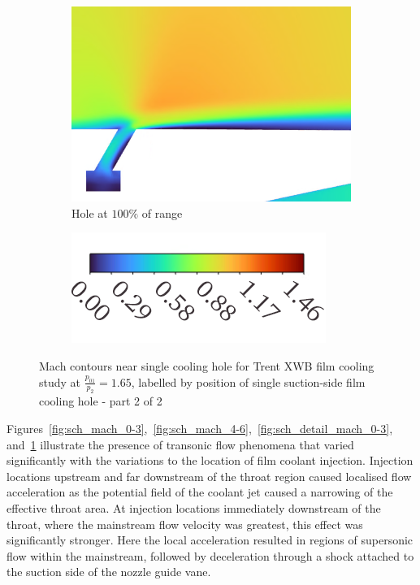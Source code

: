 \documentclass[a4paper, 11pt, oneside]{report}
\begin{document}
\begin{figure}[H]
\begin{subfigure}{.42\textwidth}
		\includegraphics[width=\linewidth]{figs/sch_detail_mach_contours_6.png}
		\caption{Hole at $100\%$ of range}
	\end{subfigure}
	\hspace{0.071\textwidth}
	\begin{subfigure}{.4\textwidth}
		\centering
		\includegraphics[width=\linewidth]{figs/mach_legend_sch_horizontal.png}
	\end{subfigure}
	\caption{Mach contours near single cooling hole for Trent XWB film cooling study at $\frac{p_{01}}{p_2}=1.65$, labelled by position of single suction-side film cooling hole - part 2 of 2}
	\label{fig:sch_detail_mach_4-6}
\end{figure}

Figures~\ref{fig:sch_mach_0-3},~\ref{fig:sch_mach_4-6},~\ref{fig:sch_detail_mach_0-3}, and~\ref{fig:sch_detail_mach_4-6} illustrate the presence of transonic flow phenomena that varied significantly with the variations to the location of film coolant injection. Injection locations upstream and far downstream of the throat region caused localised flow acceleration as the potential field of the coolant jet caused a narrowing of the effective throat area. At injection locations immediately downstream of the throat, where the mainstream flow velocity was greatest, this effect was significantly stronger. Here the local acceleration resulted in regions of supersonic flow within the mainstream, followed by deceleration through a shock attached to the suction side of the nozzle guide vane. 
\end{document}
